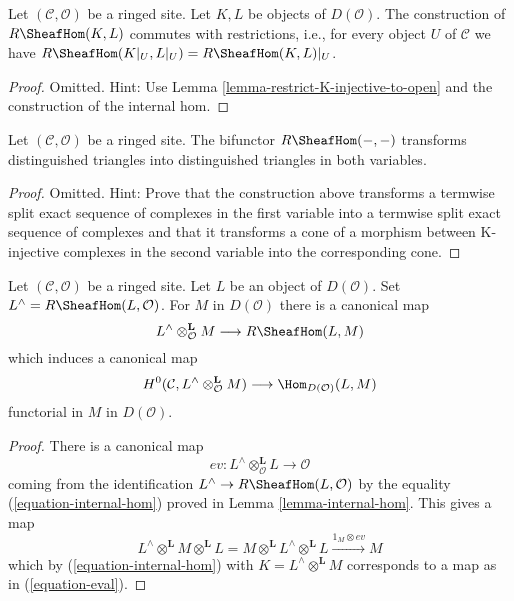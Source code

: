 \begin{lemma}
\label{lemma-restriction-RHom-to-U}
Let $(\mathcal{C}, \mathcal{O})$ be a ringed site. Let $K, L$ be objects
of $D(\mathcal{O})$. The construction of $R\SheafHom(K, L)$
commutes with restrictions, i.e.,
for every object $U$ of $\mathcal{C}$ we have
$R\SheafHom(K|_U, L|_U) = R\SheafHom(K, L)|_U$.
\end{lemma}

\begin{proof}
Omitted. Hint: Use Lemma \ref{lemma-restrict-K-injective-to-open}
and the construction of the internal hom.
\end{proof}

\begin{lemma}
\label{lemma-RHom-triangulated}
Let $(\mathcal{C}, \mathcal{O})$ be a ringed site. The bifunctor
$R\SheafHom(- , -)$ transforms distinguished triangles into
distinguished triangles in both variables.
\end{lemma}

\begin{proof}
Omitted. Hint: Prove that the construction above transforms a termwise
split exact sequence of complexes in the first variable into a termwise
split exact sequence of complexes and that it transforms a cone of a
morphism between K-injective complexes in the second variable into the
corresponding cone.
\end{proof}

\begin{lemma}
\label{lemma-dual}
Let $(\mathcal{C}, \mathcal{O})$ be a ringed site. Let $L$ be an
object of $D(\mathcal{O})$. Set $L^\wedge = R\SheafHom(L, \mathcal{O})$.
For $M$ in $D(\mathcal{O})$ there is a canonical map
\begin{equation}
\label{equation-eval}
L^\wedge \otimes^\mathbf{L}_\mathcal{O} M \longrightarrow R\SheafHom(L, M)
\end{equation}
which induces a canonical map
$$
H^0(\mathcal{C}, L^\wedge \otimes_\mathcal{O}^\mathbf{L} M)
\longrightarrow
\Hom_{D(\mathcal{O})}(L, M)
$$
functorial in $M$ in $D(\mathcal{O})$.
\end{lemma}

\begin{proof}
There is a canonical map
$$
ev : L^\wedge \otimes^\mathbf{L}_\mathcal{O} L \longrightarrow \mathcal{O}
$$
coming from the identification $L^\wedge \to R\SheafHom(L, \mathcal{O})$
by the equality (\ref{equation-internal-hom}) proved in
Lemma \ref{lemma-internal-hom}. This gives a map
$$
L^\wedge \otimes^\mathbf{L} M \otimes^\mathbf{L} L =
M \otimes^\mathbf{L} L^\wedge \otimes^\mathbf{L} L
\xrightarrow{1_M \otimes ev}
M
$$
which by (\ref{equation-internal-hom}) with $K = L^\wedge \otimes^\mathbf{L} M$
corresponds to a map as in (\ref{equation-eval}).
\end{proof}

